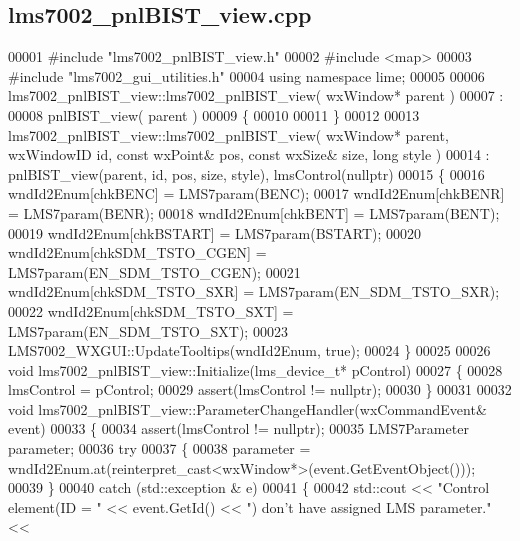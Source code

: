 \subsection{lms7002\+\_\+pnl\+B\+I\+S\+T\+\_\+view.\+cpp}
\label{lms7002__pnlBIST__view_8cpp_source}

\begin{DoxyCode}
00001 \textcolor{preprocessor}{#include "lms7002_pnlBIST_view.h"}
00002 \textcolor{preprocessor}{#include <map>}
00003 \textcolor{preprocessor}{#include "lms7002_gui_utilities.h"}
00004 \textcolor{keyword}{using namespace }lime;
00005 
00006 lms7002_pnlBIST_view::lms7002_pnlBIST_view( wxWindow* parent )
00007 :
00008 pnlBIST_view( parent )
00009 \{
00010 
00011 \}
00012 
00013 lms7002_pnlBIST_view::lms7002_pnlBIST_view( wxWindow* parent, wxWindowID \textcolor{keywordtype}{id}, \textcolor{keyword}{const} wxPoint& pos, \textcolor{keyword}{const} 
      wxSize& size, \textcolor{keywordtype}{long} style )
00014     : pnlBIST_view(parent, id, pos, size, style), lmsControl(nullptr)
00015 \{
00016     wndId2Enum[chkBENC] = LMS7param(BENC);
00017     wndId2Enum[chkBENR] = LMS7param(BENR);
00018     wndId2Enum[chkBENT] = LMS7param(BENT);
00019     wndId2Enum[chkBSTART] = LMS7param(BSTART);
00020     wndId2Enum[chkSDM_TSTO_CGEN] = LMS7param(EN_SDM_TSTO_CGEN);
00021     wndId2Enum[chkSDM_TSTO_SXR] = LMS7param(EN_SDM_TSTO_SXR);
00022     wndId2Enum[chkSDM_TSTO_SXT] = LMS7param(EN_SDM_TSTO_SXT);
00023     LMS7002_WXGUI::UpdateTooltips(wndId2Enum, \textcolor{keyword}{true});
00024 \}
00025 
00026 \textcolor{keywordtype}{void} lms7002_pnlBIST_view::Initialize(lms_device_t* pControl)
00027 \{
00028     lmsControl = pControl;
00029     assert(lmsControl != \textcolor{keyword}{nullptr});
00030 \}
00031 
00032 \textcolor{keywordtype}{void} lms7002_pnlBIST_view::ParameterChangeHandler(wxCommandEvent& event)
00033 \{
00034     assert(lmsControl != \textcolor{keyword}{nullptr});
00035     LMS7Parameter parameter;
00036     \textcolor{keywordflow}{try}
00037     \{
00038         parameter = wndId2Enum.at(reinterpret\_cast<wxWindow*>(event.GetEventObject()));
00039     \}
00040     \textcolor{keywordflow}{catch} (std::exception & e)
00041     \{
00042         std::cout << \textcolor{stringliteral}{"Control element(ID = "} << \textcolor{keyword}{event}.GetId() << \textcolor{stringliteral}{") don't have assigned LMS parameter."} << 

\end{DoxyCode}
